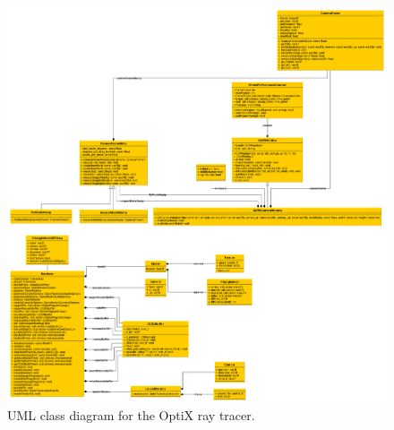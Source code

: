 \begin{figure}[hbt!]
  \centering
  \includegraphics[width=\textwidth]{figuras/optix-uml.png}
  \caption{UML class diagram for the OptiX ray tracer.}
  \label{optix-uml}
\end{figure}

\clearpage
